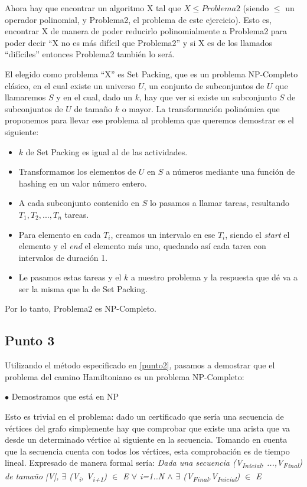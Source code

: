 \documentclass[a4paper,10pt]{article}
\begin{document}
	Ahora hay que encontrar un algoritmo X tal que $X \leq Problema2$ (siendo $\leq$ un operador polinomial, y Problema2, el problema de este ejercicio). Esto es, encontrar X de manera de poder reducirlo polinomialmente a Problema2 para poder decir ``X no es más difícil que Problema2'' y si X es de los llamados “difíciles” entonces Problema2 también lo será.

	El elegido como problema ``X'' es Set Packing, que es un problema NP-Completo clásico, en el cual existe un universo $U$, un conjunto de subconjuntos de $U$ que llamaremos $S$ y en el cual, dado un $k$, hay que ver si existe un subconjunto $S$ de subconjuntos de $U$ de tamaño $k$ o mayor. La transformación polinómica que proponemos para llevar ese problema al problema que queremos demostrar es el siguiente:
	\begin{itemize}
		\item $k$ de Set Packing es igual al de las actividades.
		\item Transformamos los elementos de $U$ en $S$ a números mediante una función de hashing en un valor número entero.
		\item A cada subconjunto contenido en $S$ lo pasamos a llamar tareas, resultando $T_1, T_2, ..., T_n$ tareas.
		\item Para elemento en cada $T_i$, creamos un intervalo en ese $T_i$, siendo el \textit{start} el elemento y el \textit{end} el elemento más uno, quedando así cada tarea con intervalos de duración 1.
		\item Le pasamos estas tareas y el $k$ a nuestro problema y la respuesta que dé va a ser la misma que la de Set Packing.
	\end{itemize}

	Por lo tanto, Problema2 es NP-Completo.

\subsection{Punto 3}
	Utilizando el método especificado en \ref{punto2}, pasamos a demostrar que el problema del camino Hamiltoniano es un problema NP-Completo:

	$\bullet$ Demostramos que está en NP

	Esto es trivial en el problema: dado un certificado que sería una secuencia de vértices del grafo simplemente hay que comprobar que existe una arista que va desde un determinado vértice al siguiente en la secuencia. Tomando en cuenta que la secuencia cuenta con todos los vértices, esta comprobación es de tiempo lineal. Expresado de manera formal sería:
	\emph{Dada  una secuencia (V\textsubscript{Inicial}, ...,V\textsubscript{Final}) de tamaño |V|, $\exists$ (V\textsubscript{i}, V\textsubscript{i+1}) $\in$ E $\forall$ i=1..N $\wedge$ $\exists$ (V\textsubscript{Final},V\textsubscript{Inicial}) $\in$ E } \\
\end{document}
